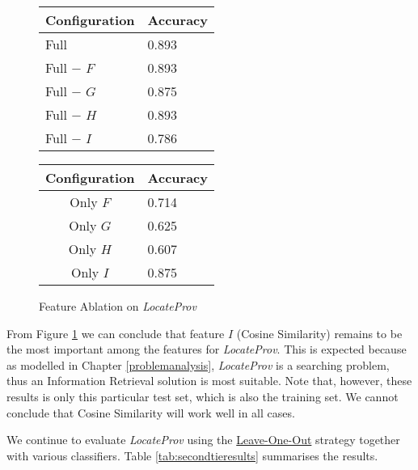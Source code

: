 \begin{figure}[ht]
\begin{minipage}[b]{0.45\linewidth}\centering
\begin{tabular}{ l | l }
Configuration & Accuracy \\
\hline
Full			& 0.893 \\
Full $-$ $F$	& 0.893 \\
Full $-$ $G$	& 0.875 \\
Full $-$ $H$	& 0.893 \\
Full $-$ $I$	& 0.786 \\
\end{tabular}
\end{minipage}
\hspace{0.5cm}
\begin{minipage}[b]{0.45\linewidth}\centering
\begin{tabular}{ c | l }
Configuration & Accuracy \\
\hline
Only $F$	& 0.714 \\
Only $G$	& 0.625 \\
Only $H$	& 0.607 \\
Only $I$	& 0.875 \\
\end{tabular}
\end{minipage}
\caption{Feature Ablation on {\it LocateProv}}
\label{fig:ablation_second}
\end{figure}
From Figure \ref{fig:ablation_second} we can conclude that feature $I$ (Cosine Similarity) remains to be the most important among the features for {\it LocateProv}. This is expected because as modelled in Chapter \ref{problemanalysis}, {\it LocateProv} is a searching problem, thus an Information Retrieval solution is most suitable. Note that, however, these results is only this particular test set, which is also the training set. We cannot conclude that Cosine Similarity will work well in all cases.

We continue to evaluate {\it LocateProv} using the \url{Leave-One-Out} strategy together with various classifiers. Table \ref{tab:secondtieresults} summarises the results.

